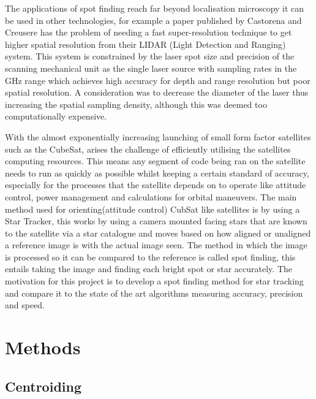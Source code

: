 \documentclass[aps,pra,a4paper,nofootinbib,onecolumn,tightenlines,longbibliography,12pt,amsfonts,amssymb,amsmath,floatfix]{revtex4-2} %
\begin{document}
  The applications of spot finding reach far beyond localisation microscopy it 
  can be used in other technologies, for example a paper published by Castorena and Creusere \cite{6638050}
  has the problem of needing a fast super-resolution technique to get higher 
  spatial resolution from their LIDAR (Light Detection and Ranging) system. This system is constrained by the 
  laser spot size and precision of the scanning mechanical unit as the single laser 
  source with sampling rates in the GHz range which achieves high accuracy for depth 
  and range resolution but poor spatial resolution. A consideration was to decrease the 
  diameter of the laser thus increasing the spatial sampling density, although this 
  was deemed too computationally expensive.
  
  With the almost exponentially increasing launching of small form factor
  satellites such as the CubeSat, arises the challenge of efficiently utilising
  the satellites computing resources. This means any segment of code being ran on
  the satellite needs to run as quickly as possible whilst keeping a certain
  standard of accuracy, especially for the processes that the satellite depends
  on to operate like attitude control, power management and calculations for
  orbital maneuvers. The main method used for orienting(attitude control) CubSat
  like satellites is by using a Star Tracker, this works by using a camera mounted
  facing stars that are known to the satellite via a star catalogue and moves
  based on how aligned or unaligned a reference image is with the actual image
  seen.\cite{calitz2015design} The method in which the image is processed so it
  can be compared to the reference is called spot finding, this entails taking
  the image and finding each bright spot or star accurately. The motivation for
  this project is to develop a spot finding method for star tracking and compare
  it to the state of the art algorithms measuring accuracy, precision and speed.




\section{Methods} %
\label{sec:Methods}

  \subsection{Centroiding} %
  \label{sub:Centroiding_meth}
  
\end{document}
